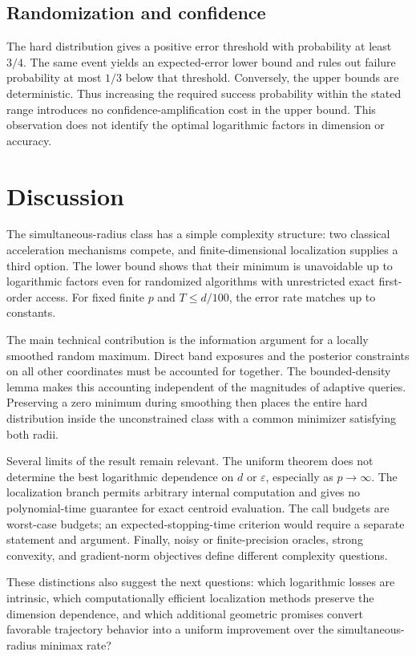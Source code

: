 \documentclass[11pt]{article}
\newcommand{\eps}{\varepsilon}
\theoremstyle{definition}
\theoremstyle{remark}
\begin{document}
\subsection{Randomization and confidence}

The hard distribution gives a positive error threshold with probability
at least $3/4$. The same event yields an expected-error lower bound
and rules out failure probability at most $1/3$ below that threshold.
Conversely, the upper bounds are deterministic. Thus increasing the
required success probability within the stated range introduces no
confidence-amplification cost in the upper bound. This observation
does not identify the optimal logarithmic factors in dimension or
accuracy.


\section{Discussion}
\label{sec:discussion}

The simultaneous-radius class has a simple complexity structure:
two classical acceleration mechanisms compete, and finite-dimensional
localization supplies a third option. The lower bound shows that their
minimum is unavoidable up to logarithmic factors even for randomized
algorithms with unrestricted exact first-order access. For fixed
finite $p$ and $T\le d/100$, the error rate matches up to constants.

The main technical contribution is the information argument for a
locally smoothed random maximum. Direct band exposures and the
posterior constraints on all other coordinates must be accounted for
together. The bounded-density lemma makes this accounting independent
of the magnitudes of adaptive queries. Preserving a zero minimum
during smoothing then places the entire hard distribution inside the
unconstrained class with a common minimizer satisfying both radii.

Several limits of the result remain relevant. The uniform theorem
does not determine the best logarithmic dependence on $d$ or
$\eps$, especially as $p\to\infty$. The localization branch permits
arbitrary internal computation and gives no polynomial-time guarantee
for exact centroid evaluation. The call budgets are worst-case
budgets; an expected-stopping-time criterion would require a separate
statement and argument. Finally, noisy or finite-precision oracles,
strong convexity, and gradient-norm objectives define different
complexity questions.

These distinctions also suggest the next questions: which logarithmic
losses are intrinsic, which computationally efficient localization
methods preserve the dimension dependence, and which additional
geometric promises convert favorable trajectory behavior into a
uniform improvement over the simultaneous-radius minimax rate?
\end{document}
